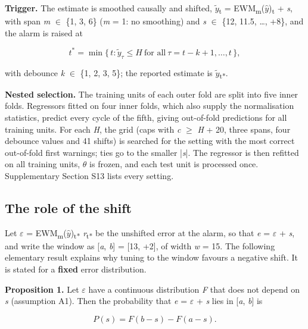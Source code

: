 \documentclass[a4paper,fleqn,doubleblind]{cas-dc}
\begin{document}
\textbf{Trigger.} The estimate is smoothed causally and shifted, $\tilde{y}$\textsubscript{t} = EWM\textsubscript{m}($\hat{y}$)\textsubscript{t} + \textit{s}, with span \textit{m} $\in$ \{1, 3, 6\} (\textit{m} = 1: no smoothing) and \textit{s} $\in$ \{\textminus{}12, \textminus{}11.5, \ldots{}, +8\}, and the alarm is raised at

\begin{equation}
t^{*} = \min\{\, t : \tilde{y}_{\tau} \le H \ \text{for all}\ \tau = t-k+1, \ldots, t \,\},
\end{equation}

with debounce \textit{k} $\in$ \{1, 2, 3, 5\}; the reported estimate is $\tilde{y}$\textsubscript{t*}.

\textbf{Nested selection.} The training units of each outer fold are split into five inner folds. Regressors fitted on four inner folds, which also supply the normalisation statistics, predict every cycle of the fifth, giving out-of-fold predictions for all training units. For each \textit{H}, the grid (caps with \textit{c} $\ge$ \textit{H} + 20, three spans, four debounce values and 41 shifts) is searched for the setting with the most correct out-of-fold first warnings; ties go to the smaller |\textit{s}|. The regressor is then refitted on all training units, $\theta$ is frozen, and each test unit is processed once. Supplementary Section S13 lists every setting.

\subsection{The role of the shift}

Let $\varepsilon$ = EWM\textsubscript{m}($\hat{y}$)\textsubscript{t*} \textminus{} \textit{r}\textsubscript{t*} be the unshifted error at the alarm, so that \textit{e} = $\varepsilon$ + \textit{s}, and write the window as [\textit{a}, \textit{b}] = [\textminus{}13, +2], of width \textit{w} = 15. The following elementary result explains why tuning to the window favours a negative shift. It is stated for a \textbf{fixed} error distribution.

\textbf{Proposition 1.} Let $\varepsilon$ have a continuous distribution \textit{F} that does not depend on \textit{s} (assumption A1). Then the probability that \textit{e} = $\varepsilon$ + \textit{s} lies in [\textit{a}, \textit{b}] is

\begin{equation}
P(s) = F(b - s) - F(a - s).
\end{equation}
\end{document}
